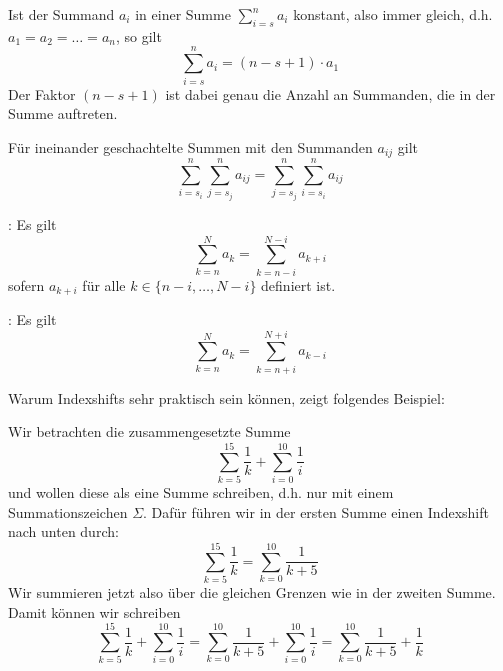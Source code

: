 \begin{proposition}\label{prop:rechnen-mit-summen}
    \begin{thmenum}
        \item {} Ist der Summand \(a_i\) in einer Summe \(\sum_{i=s}^n a_i\) konstant, also immer gleich, d.h. \(a_1 = a_2 = \dots = a_n\), so gilt \begin{equation*}
            \sum_{i=s}^n a_i = (n-s+1)\cdot a_1
        \end{equation*}
        Der Faktor \((n-s+1)\) ist dabei genau die Anzahl an Summanden, die in der Summe auftreten. 

        \item \label{prop:rechnen-mit-summen-(2)}  Für ineinander geschachtelte Summen mit den Summanden \(a_{ij}\) gilt 
        \begin{equation*}
            \sum_{i=s_i}^n \sum_{j=s_j}^n a_{ij} = \sum_{j=s_j}^n \sum_{i=s_i}^n a_{ij}
        \end{equation*}

        \item {}: Es gilt 
        \begin{equation*}
            \sum_{k=n}^N a_k = \sum_{k=n-i}^{N-i} a_{k+i}
        \end{equation*}
        sofern \(a_{k+i}\) für alle \(k\in \{n-i, \dots, N-i\}\) definiert ist. 

        \item {}: Es gilt 
        \begin{equation*}
            \sum_{k=n}^N a_k = \sum_{k=n+i}^{N+i} a_{k-i}
        \end{equation*}
        
    \end{thmenum}
\end{proposition}
Warum Indexshifts sehr praktisch sein können, zeigt folgendes Beispiel:  

\begin{exampleth}
    Wir betrachten die zusammengesetzte Summe 
    \begin{equation*}
        \sum_{k=5}^{15} \frac{1}{k} + \sum_{i=0}^{10} \frac{1}{i} 
    \end{equation*}
    und wollen diese als eine Summe schreiben, d.h. nur mit einem Summationszeichen \(\Sigma\). Dafür führen wir in der ersten Summe einen Indexshift nach unten durch:
    \begin{equation*}
        \sum_{k=5}^{15} \frac{1}{k} = \sum_{k=0}^{10} \frac{1}{k+5}
    \end{equation*}
    Wir summieren jetzt also über die gleichen Grenzen wie in der zweiten Summe. Damit können wir schreiben
    \begin{equation*}
        \sum_{k=5}^{15} \frac{1}{k} + \sum_{i=0}^{10} \frac{1}{i} = \sum_{k=0}^{10} \frac{1}{k+5} + \sum_{i=0}^{10} \frac{1}{i} = \sum_{k=0}^{10} \frac{1}{k+5} + \frac{1}{k}
    \end{equation*}
\end{exampleth}


